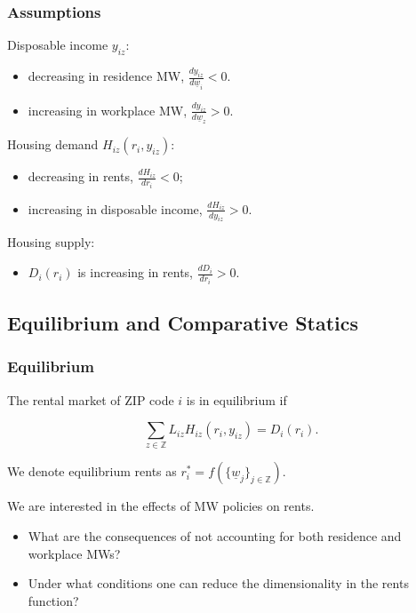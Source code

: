 \begin{frame}
	\frametitle{Assumptions}
	
	Disposable income $y_{i z}$:
	\begin{itemize} \small
		\item decreasing in residence MW, $\frac{d y_{i z}}{d \underline{w}_i} < 0$.
		
		\vspace{.5mm}
		\item increasing in workplace MW, $\frac{d y_{i z}}{d \underline{w}_z} > 0$.
	\end{itemize}

	\pause
	\vspace{2mm}
	Housing demand $H_{i z} \left(r_i, y_{i z} \right)$:
	\begin{itemize} \small
		\item decreasing in rents, $\frac{d H_{i z}}{d r_i} < 0$;
		
		\vspace{.5mm}
		\item increasing in disposable income, $\frac{d H_{i z}}{d y_{i z}} > 0$.
	\end{itemize}
	
	\pause
	\vspace{2mm}
	Housing supply: 
	\begin{itemize} \small
		\item $D_i \left(r_i \right)$ is increasing in rents, $\frac{d D_i}{d 
			r_i} > 0$.
	\end{itemize}
\end{frame}

\subsection{Equilibrium and Comparative Statics}
\begin{frame}
	\frametitle{Equilibrium}
	
	The rental market of ZIP code $i$ is in equilibrium if
	
	$$ \sum_{z\in\mathbb{Z}} L_{i z} H_{i z} (r_i, y_{i z}) =  D_i (r_i) .$$
	
	We denote equilibrium rents as $r^*_i = f\left( 
	\{\underline{w}_j\}_{j\in\mathbb{Z}} \right)$. 
	
	
	\vspace{5mm}
	\pause
	We are interested in the effects of MW policies on rents.
	\vspace{1mm}
	\begin{itemize} \small
		\item What are the consequences of not accounting for both residence and 
		workplace MWs?
		\vspace{.5mm}
		\item Under what conditions one can reduce the dimensionality in the rents 
		function?
	\end{itemize}

\end{frame}


